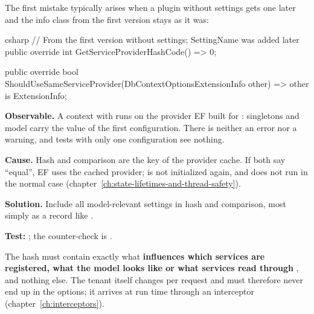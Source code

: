 The first mistake typically arises when a plugin without settings gets one later and the
info class from the first version stays as it was:

\begin{sourcecode}{csharp}
// From the first version without settings; SettingName was added later
public override int GetServiceProviderHashCode() => 0;

public override bool ShouldUseSameServiceProvider(DbContextOptionsExtensionInfo other)
    => other is ExtensionInfo;
\end{sourcecode}

\begin{failure}
  \textbf{Observable.} A context with  runs on the provider EF
  built for : singletons and model carry the value of the first
  configuration. There is neither an error nor a warning, and tests with only one
  configuration see nothing.

  \textbf{Cause.} Hash and comparison are the key of the provider cache. If both say
  “equal”, EF uses the cached provider;  is not
  initialized again, and  does not run in the normal case
  (chapter~\ref{ch:state-lifetimes-and-thread-safety}).

  \textbf{Solution.} Include all model-relevant settings in hash and comparison, most
  simply as a record like .

  \textbf{Test:}
  ;
  the counter-check is
  .
\end{failure}

\begin{important}
  The hash must contain exactly what \textbf{influences which services are registered,
  what the model looks like or what services read through
  }, and nothing else. The tenant itself changes per request and
  must therefore never end up in the options; it arrives at run time through an interceptor
  (chapter~\ref{ch:interceptors}).
\end{important}

